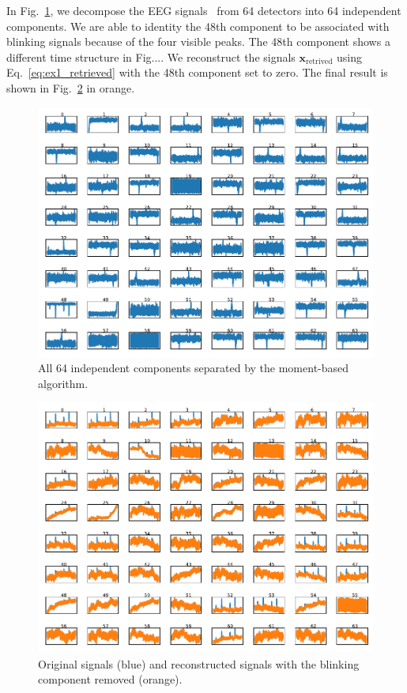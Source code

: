 \documentclass[aps,prl,preprint,superscriptaddress]{revtex4-2}
\begin{document}
In Fig.~\ref{fig:ex3_ica}, we decompose the EEG signals~\cite{talebi2021eeg} from 64 detectors into 64 independent components.
We are able to identity the 48th component to be associated with blinking signals because of the four visible peaks.
The 48th component shows a different time structure in Fig....
We reconstruct the signals $\mathbf{x}_{\mathrm{retrived}}$ using Eq.~\ref{eq:ex1_retrieved} with the 48th component set to zero.
The final result is shown in Fig.~\ref{fig:ex3_noblinks} in orange.
\begin{figure}
\includegraphics{scripts/ex3_ica.pdf}
\caption{\label{fig:ex3_ica} All 64 independent components separated by the moment-based algorithm.}
\end{figure}
\begin{figure}
\includegraphics{scripts/ex3_noblinks.pdf}
\caption{\label{fig:ex3_noblinks} Original signals (blue) and reconstructed signals with the blinking component removed (orange).}
\end{figure}
\end{document}
